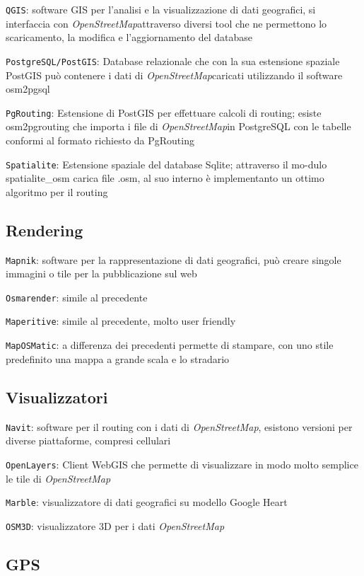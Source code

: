 \documentclass[a4paper,twoside,12pt,]{article}
\newcommand{\osm}{\emph{OpenStreetMap\xspace}}
\begin{document}
\texttt{QGIS}: software GIS per l'analisi e la visualizzazione di dati geografici, si interfaccia con \osm attraverso diversi tool che ne permettono lo scaricamento, la modifica e l'aggiornamento del database

\texttt{PostgreSQL/PostGIS}: Database relazionale che con la sua estensione spaziale PostGIS può contenere i dati di \osm caricati utilizzando il software osm2pgsql

\texttt{PgRouting}: Estensione di PostGIS per effettuare calcoli di routing; esiste osm2pgrouting che importa i file di \osm in PostgreSQL con le tabelle conformi al formato richiesto da PgRouting

\texttt{Spatialite}: Estensione spaziale del database Sqlite; attraverso il mo-dulo spatialite\_osm carica file .osm, al suo interno è implementanto un ottimo algoritmo per il routing 

\subsection{Rendering}

\texttt{Mapnik}: software per la rappresentazione di dati geografici, può creare singole immagini o tile per la pubblicazione sul web

\texttt{Osmarender}: simile al precedente

\texttt{Maperitive}: simile al precedente, molto user friendly

\texttt{MapOSMatic}: a differenza dei precedenti permette di stampare, con uno stile predefinito una mappa a grande scala e lo stradario

\subsection{Visualizzatori}

\texttt{Navit}: software per il routing con i dati di \osm, esistono versioni per diverse piattaforme, compresi cellulari

\texttt{OpenLayers}: Client WebGIS che permette di visualizzare in modo molto semplice le tile di \osm

\texttt{Marble}: visualizzatore di dati geografici su modello Google Heart

\texttt{OSM3D}: visualizzatore 3D per i dati \osm

\subsection{GPS}
\end{document}
